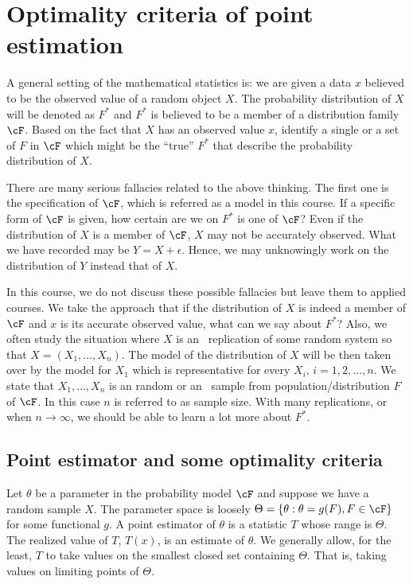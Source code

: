 \chapter{Optimality criteria of point estimation}

A general setting of the mathematical statistics is: we are given a data
$x$ believed to be the observed value of a random object $X$. The probability
distribution of $X$ will be denoted as $F^*$ and $F^*$ is believed to be
a member of a distribution family $\cF$. Based on the fact that $X$ has
an observed value $x$, identify a single or a set of $F$ in $\cF$ which
might be the ``true'' $F^*$ that describe the probability distribution of $X$.

There are many serious fallacies related to the above thinking. The first
one  is the specification of $\cF$, which is referred as a model
in this course. If a specific form of $\cF$ is given, how certain are we
on $F^*$ is one of $\cF$? Even if the distribution of $X$ is a member of $\cF$,
$X$ may not be accurately observed. What we have recorded may be
$Y = X + \epsilon$. Hence, we may unknowingly work on the distribution
of $Y$ instead that of $X$.

In this course, we do not discuss these possible fallacies but
leave them to applied courses. We take the approach that
if the distribution of $X$ is indeed a member of $\cF$ and $x$ is its
accurate observed value, what can we say about $F^*$? 
Also, we often study the situation where $X$ is an \iid\ replication of
some random system so that $X = (X_1, \ldots, X_n)$.
The model of the distribution of $X$ will be then taken over by the
model for $X_1$ which is representative for every $X_i$,
$i=1, 2, \ldots, n$. We state that $X_1, \ldots, X_n$ is an random
or an \iid\ sample from population/distribution $F$ of $\cF$. 
In this case $n$ is referred to as sample size.
With many replications, or when $n \to \infty$, we should be able to learn
a lot more about $F^*$. 

\section{Point estimator and some optimality criteria}

Let $\theta$ be a parameter in the probability model $\cF$ and 
suppose we have a random sample $X$. The parameter space is
loosely $\Theta = \{ \theta: \theta = g(F), F \in \cF\}$ for some functional
$g$. A point estimator of $\theta$ is a statistic $T$
whose range is $\Theta$. The realized value of $T$, $T(x)$, is an estimate
of $\theta$. We generally allow, for the least, $T$ to take values on 
the smallest closed set containing $\Theta$. That is, taking values
on limiting points of $\Theta$. 

